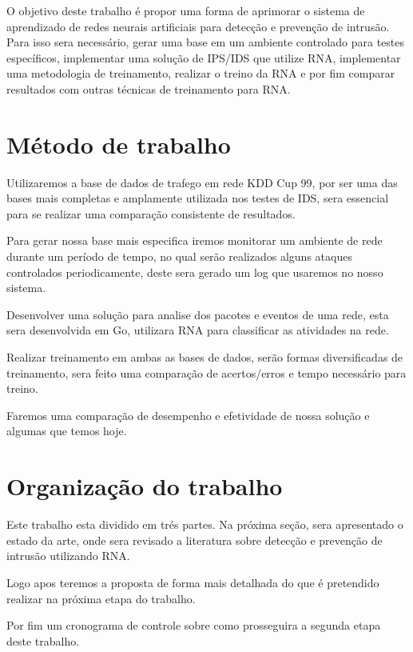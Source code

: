 O objetivo deste trabalho é propor uma forma de aprimorar o sistema de aprendizado de redes neurais artificiais para detecção e prevenção de intrusão. 
Para isso sera necessário, gerar uma base em um ambiente controlado para testes específicos, implementar uma solução de IPS/IDS que utilize RNA, implementar uma metodologia de treinamento, realizar o treino da RNA e por fim comparar resultados com outras técnicas de treinamento para RNA.


\section{Método de trabalho}

Utilizaremos a base de dados de trafego em rede KDD Cup 99\cite{KDDCup99}, por ser uma das bases mais completas e amplamente utilizada nos testes de IDS, sera essencial para se realizar uma comparação consistente de resultados.

Para gerar nossa base mais especifica iremos monitorar um ambiente de rede durante um período de tempo, no qual serão realizados alguns ataques controlados periodicamente, deste sera gerado um log que usaremos no nosso sistema.

Desenvolver uma solução para analise dos pacotes e eventos de uma rede, esta sera desenvolvida em Go, utilizara RNA para classificar as atividades na rede.

Realizar treinamento em ambas as bases de dados, serão formas diversificadas de treinamento, sera feito uma comparação de acertos/erros e tempo necessário para treino.

Faremos uma comparação de desempenho e efetividade de nossa solução e algumas que temos hoje.

\section{Organização do trabalho}

Este trabalho esta dividido em trés partes.
Na próxima seção, sera apresentado o estado da arte, onde sera revisado a literatura sobre detecção e prevenção de intrusão utilizando RNA.

Logo apos teremos a proposta  de forma mais detalhada do que é pretendido realizar na próxima etapa do trabalho.

Por fim um cronograma de controle sobre como prosseguira a segunda etapa deste trabalho.

